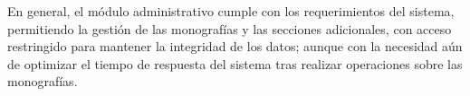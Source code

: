 En general, el módulo administrativo cumple con los requerimientos del sistema, permitiendo la gestión de las monografías y las secciones adicionales, 
con acceso restringido para mantener la integridad de los datos; aunque con la necesidad aún de optimizar el tiempo de respuesta del sistema tras
realizar operaciones sobre las monografías.

